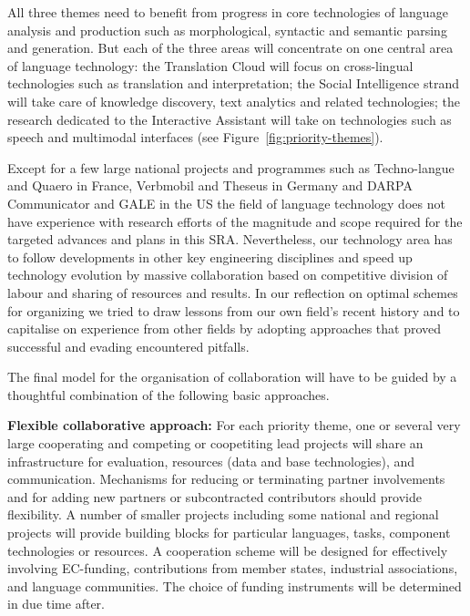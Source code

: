 \documentclass[10pt, plain]{../../metanetpaper}
\begin{document}
\begin{multicols}{2}
All three themes need to benefit from progress in core technologies of language analysis and production such as morphological, syntactic and semantic parsing and generation. But each of the three areas will concentrate on one central area of language technology: the Translation Cloud will focus on cross-lingual technologies such as translation and interpretation; the Social Intelligence strand will take care of knowledge discovery, text analytics and related technologies; the research dedicated to the Interactive Assistant will take on technologies such as speech and multimodal interfaces (see Figure~\ref{fig:priority-themes}).

Except for a few large national projects and programmes such as Techno-langue and Quaero in France, Verbmobil and Theseus in Germany and DARPA Communicator and GALE in the US the field of language technology does not have experience with research efforts of the magnitude and scope required for the targeted advances and plans in this SRA. Nevertheless, our technology area has to follow developments in other key engineering disciplines and speed up technology evolution by massive collaboration based on competitive division of labour and sharing of resources and results. In our reflection on optimal schemes for organizing we tried to draw lessons from our own field's recent history and to capitalise on experience from other fields by adopting approaches that proved successful and evading encountered pitfalls.
 
The final model for the organisation of collaboration will have to be guided by a thoughtful combination of the following basic approaches.


\textbf{Flexible collaborative approach:} For each priority theme, one or several very large cooperating and competing or coopetiting lead projects will share an infrastructure for evaluation, resources (data and base technologies), and communication. Mechanisms for reducing or terminating partner involvements and for adding new partners or subcontracted contributors should provide flexibility. A number of smaller projects including some national and regional projects will provide building blocks for particular languages, tasks, component technologies or resources. A cooperation scheme will be designed for effectively involving EC-funding, contributions from member states, industrial associations, and language communities. The choice of funding instruments will be determined in due time after.


\end{multicols}
\end{document}
